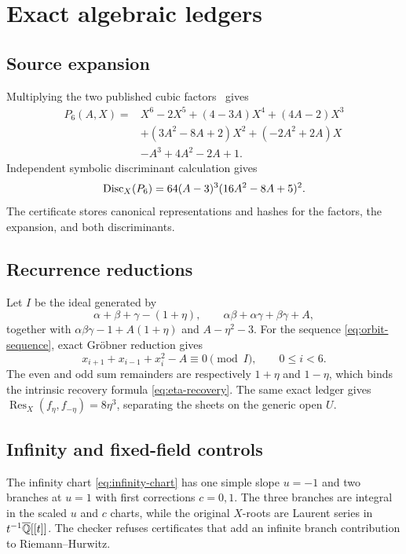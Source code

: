 \section{Exact algebraic ledgers}\label{app:ledgers}

\subsection{Source expansion}

Multiplying the two published cubic factors~\cite[Eq.~(15)]{endlergallas2006chiral}
gives
\begin{align*}
P_6(A,X)={}&X^6-2X^5+(4-3A)X^4+(4A-2)X^3\\
&+(3A^2-8A+2)X^2+(-2A^2+2A)X\\
&-A^3+4A^2-2A+1.
\end{align*}
Independent symbolic discriminant calculation gives
\[
 \operatorname{Disc}_X(P_6)=64(A-3)^3(16A^2-8A+5)^2.
\]
The certificate stores canonical representations and hashes for the factors,
the expansion, and both discriminants.

\subsection{Recurrence reductions}

Let $I$ be the ideal generated by
\[
 \alpha+\beta+\gamma-(1+\eta),
 \qquad
 \alpha\beta+\alpha\gamma+\beta\gamma+A,
\]
together with $\alpha\beta\gamma-1+A(1+\eta)$ and
$A-\eta^2-3$.  For the sequence \eqref{eq:orbit-sequence}, exact Gr\"obner
reduction gives
\[
 x_{i+1}+x_{i-1}+x_i^2-A\equiv0\pmod I,
 \qquad 0\le i<6.
\]
The even and odd sum remainders are respectively $1+\eta$ and $1-\eta$,
which binds the intrinsic recovery formula \eqref{eq:eta-recovery}.
The same exact ledger gives
$\operatorname{Res}_X(f_\eta,f_{-\eta})=8\eta^3$, separating the sheets on
the generic open $U$.

\subsection{Infinity and fixed-field controls}

The infinity chart \eqref{eq:infinity-chart} has one simple slope $u=-1$
and two branches at $u=1$ with first corrections $c=0,1$.  The three branches
are integral in the scaled $u$ and $c$ charts, while the original $X$-roots
are Laurent series in $t^{-1}\overline{\mathbb Q}[[t]]$.  The checker refuses certificates
that add an infinite branch contribution to Riemann--Hurwitz.

